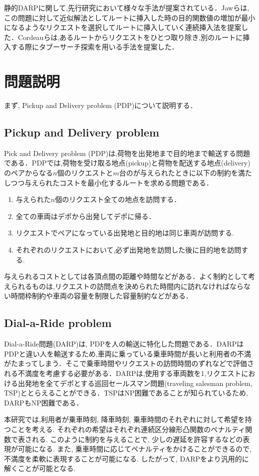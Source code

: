 \documentclass[a4j,11pt,twocolumn]{jsarticle}
\begin{document}
静的DARPに関して,先行研究において様々な手法が提案されている．Jawらは,この問題に対して近似解法としてルートに挿入した時の目的関数値の増加が最小になるようなリクエストを選択してルートに挿入していく連続挿入法を提案した\cite{insertion}．Cordeauらは,あるルートからリクエストをひとつ取り除き,別のルートに挿入する際にタブーサーチ探索を用いる手法を提案した\cite{tabu}．


\section{問題説明}
まず, Pickup and Delivery problem (PDP)について説明する．
\subsection{{\large Pickup and Delivery problem}}
Pick and Delivery problem (PDP)は,荷物を出発地まで目的地まで輸送する問題である．PDPでは,荷物を受け取る地点(pickup)と荷物を配送する地点(delivery)のペアからなる$n$個のリクエストと$m$台のが与えられたときに以下の制約を満たしつつ与えられたコストを最小化するルートを求める問題である．
\begin{enumerate}
 \item 与えられた$n$個のリクエスト全ての地点を訪問する．
 \item 全ての車両はデポから出発してデポに帰る．
 \item リクエストでペアになっている出発地と目的地は同じ車両が訪問する.
 \item それぞれのリクエストにおいて,必ず出発地を訪問した後に目的地を訪問する.
\end{enumerate}
与えられるコストとしては各頂点間の距離や時間などがある．よく制約として考えられるものは,リクエストの訪問点を決められた時間内に訪れなければならない時間枠制約や車両の容量を制限した容量制約などがある．
\subsection{{\large Dial-a-Ride problem}}
Dial-a-Ride問題(DARP)は, PDPを人の輸送に特化した問題である．DARPはPDPと違い人を輸送するため,車両に乗っている乗車時間が長いと利用者の不満がたまってしまう．そこで乗車時間やリクエストの訪問時間のずれなどで評価される不満度を考慮する必要がある．DARPは,使用する車両数を1,リクエストにおける出発地を全てデポとする巡回セールスマン問題(traveling salesman problem, TSP)ととらえることができる．TSPはNP困難\cite{TSP}であることが知られているため, DARPもNP困難である．

本研究では,利用者が乗車時刻, 降車時刻, 乗車時間のそれぞれに対して希望を持つことを考える. それぞれの希望はそれぞれ連続区分線形凸関数のペナルティ関数で表される. このように制約を与えることで, 少しの遅延を許容するなどの表現が可能になる. また, 乗車時間に応じてペナルティをかけることができるので, 不満度を柔軟に表現することが可能になる. したがって, DARPをより汎用的に解くことが可能となる.
\end{document}
